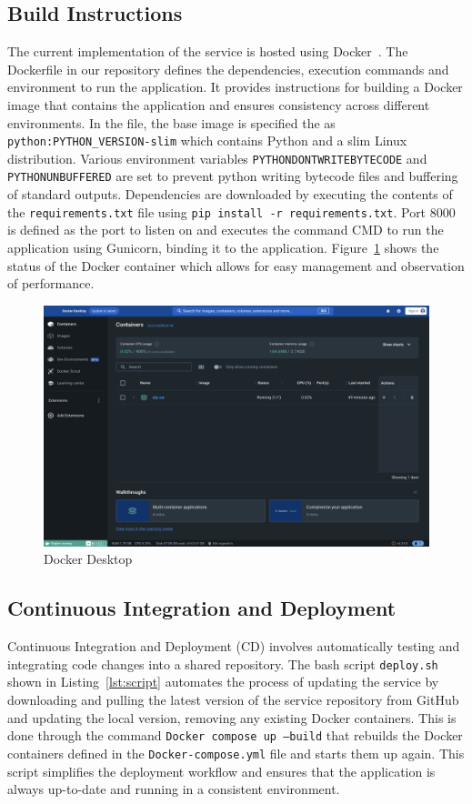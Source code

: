 \documentclass{surreydissertation}
\begin{document}
\subsection{Build Instructions}
The current implementation of the service is hosted using Docker~\cite{Docker}. The Dockerfile in our repository defines the dependencies, execution commands and environment to run the application. It provides instructions for building a Docker image that contains the application and ensures consistency across different environments. In the file, the base image is specified the as \texttt{python:PYTHON\_VERSION-slim} which contains Python and a slim Linux distribution. Various environment variables \texttt{PYTHONDONTWRITEBYTECODE} and \texttt{PYTHONUNBUFFERED} are set to prevent python writing bytecode files and buffering of standard outputs. Dependencies are downloaded by executing the contents of the \texttt{requirements.txt} file using \texttt{pip install -r requirements.txt}. Port 8000 is defined as the port to listen on and executes the command CMD to run the application using Gunicorn, binding it to the application. Figure~\ref{fig:Docker} shows the status of the Docker container which allows for easy management and observation of performance. 

\begin{figure}
    \centering
    \includegraphics[width=1.0\linewidth]{Figures/Docker.png}
    \caption{Docker Desktop}
    \label{fig:Docker}
 \end{figure}


\subsection{Continuous Integration and Deployment}
Continuous Integration and Deployment (CD) involves automatically testing and integrating code changes into a shared repository. The bash script \texttt{deploy.sh} shown in  Listing~\ref{lst:script}  automates the process of updating the service by downloading and pulling the latest version of the service repository from GitHub and updating the local version, removing any existing Docker containers.  This is done through the command \texttt{Docker compose up --build} that rebuilds the Docker containers defined in the \texttt{Docker-compose.yml} file and starts them up again. This script simplifies the deployment workflow and ensures that the application is always up-to-date and running in a consistent environment.
\end{document}
